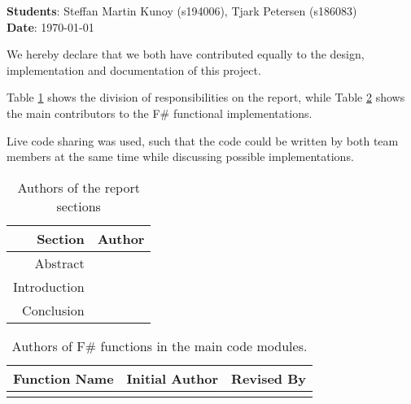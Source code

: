 \documentclass[12pt,a4paper]{report}
\begin{document}
\textbf{Students}: Steffan Martin Kunoy (s194006), Tjark Petersen (s186083)\\
\textbf{Date}: \today

\bigskip

We hereby declare that we both have contributed equally to the design, implementation and documentation of this project.

Table \ref{tab:report} shows the division of responsibilities on the report, while Table \ref{tab:functions} shows the main contributors to the F\# functional implementations.

Live code sharing was used, such that the code could be written by both team members at the same time while discussing possible implementations.

\begin{table}[h]
    \centering
    \begin{tabular}{r|c}
        \textbf{Section} & \textbf{Author}  \\\hline
        Abstract & \\
        Introduction & \\
        Conclusion & \\
    \end{tabular}
    \caption{Authors of the report sections}
    \label{tab:report}
\end{table}

\begin{longtable}{|l|c|c|}\hline
\textbf{Function Name} & \textbf{Initial Author} & \textbf{Revised By} \\\hline

\caption{Authors of F\# functions in the main code modules.}
\label{tab:functions}
\end{longtable}
\end{document}
